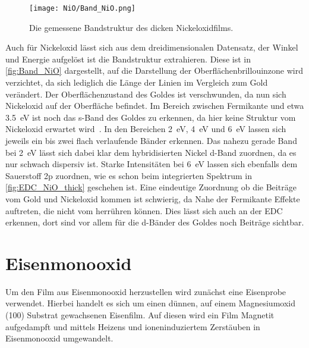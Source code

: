         \begin{figure}
            \centering
            \texttt{[image: NiO/Band\_NiO.png]}
            \caption{Die gemessene Bandstruktur des dicken Nickeloxidfilms.}
            \label{fig:Band_NiO}
        \end{figure}
        Auch für Nickeloxid lässt sich aus dem dreidimensionalen Datensatz, der Winkel und Energie aufgelöst ist die Bandstruktur extrahieren.
        Diese ist in \autoref{fig:Band_NiO} dargestellt, auf die Darstellung der Oberflächenbrillouinzone wird verzichtet, da sich lediglich die Länge der Linien im Vergleich zum Gold verändert.
        Der Oberflächenzustand des Goldes ist verschwunden, da nun sich Nickeloxid auf der Oberfläche befindet.
        Im Bereich zwischen Fermikante und etwa \SI{3.5}{\electronvolt} ist noch das s-Band des Goldes zu erkennen, da hier keine Struktur vom Nickeloxid erwartet wird~\cite{NiO_12}.
        In den Bereichen \SI{2}{\electronvolt}, \SI{4}{\electronvolt} und \SI{6}{\electronvolt} lassen sich jeweils ein bis zwei flach verlaufende Bänder erkennen.
        Das nahezu gerade Band bei \SI{2}{\electronvolt} lässt sich dabei klar dem hybridisierten Nickel d-Band zuordnen, da es nur schwach dispersiv ist.
        Starke Intensitäten bei \SI{6}{\electronvolt} lassen sich ebenfalls dem Sauerstoff 2p zuordnen, wie es schon beim integrierten Spektrum in \autoref{fig:EDC_NiO_thick} geschehen ist.
        Eine eindeutige Zuordnung ob die Beiträge vom Gold und Nickeloxid kommen ist schwierig, da Nahe der Fermikante Effekte auftreten, die nicht vom  herrühren können.
        Dies lässt sich auch an der EDC erkennen, dort sind vor allem für die d-Bänder des Goldes noch Beiträge sichtbar.
        
    \FloatBarrier
    \section{Eisenmonooxid} \label{sec:Prep_FeO}
        Um den Film aus Eisenmonooxid herzustellen wird zunächst eine Eisenprobe verwendet.
        Hierbei handelt es sich um einen dünnen, auf einem Magnesiumoxid (100) Substrat gewachsenen Eisenfilm.
        Auf diesen wird ein Film Magnetit aufgedampft und mittels Heizens und ioneninduziertem Zerstäuben in Eisenmonooxid umgewandelt.

